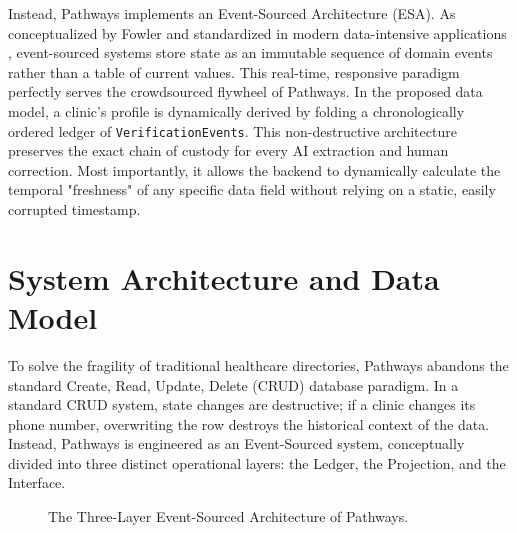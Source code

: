 \documentclass[12pt,oneside]{report}
\begin{document}
Instead, Pathways implements an Event-Sourced Architecture (ESA). As conceptualized by Fowler \cite{55} and standardized in modern data-intensive applications \cite{57}, event-sourced systems store state as an immutable sequence of domain events rather than a table of current values. This real-time, responsive paradigm \cite{60} perfectly serves the crowdsourced flywheel of Pathways. In the proposed data model, a clinic's profile is dynamically derived by folding a chronologically ordered ledger of \texttt{VerificationEvents}. This non-destructive architecture preserves the exact chain of custody for every AI extraction and human correction. Most importantly, it allows the backend to dynamically calculate the temporal "freshness" of any specific data field without relying on a static, easily corrupted timestamp.

\section{System Architecture and Data Model}
To solve the fragility of traditional healthcare directories, Pathways abandons the standard Create, Read, Update, Delete (CRUD) database paradigm. In a standard CRUD system, state changes are destructive; if a clinic changes its phone number, overwriting the row destroys the historical context of the data. Instead, Pathways is engineered as an Event-Sourced system, conceptually divided into three distinct operational layers: the Ledger, the Projection, and the Interface.

\begin{figure}[htbp]
\centering
{}
\caption{The Three-Layer Event-Sourced Architecture of Pathways.}
\label{fig:pathways_architecture}
\end{figure}
\end{document}

